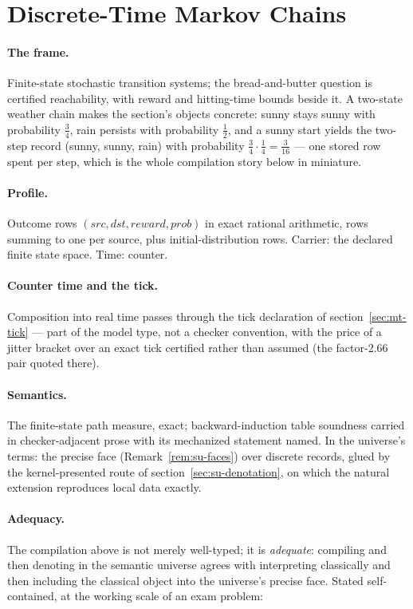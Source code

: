 \section{Discrete-Time Markov Chains}
\label{sec:mt-dtmc}

\paragraph{The frame.} Finite-state stochastic transition systems;
the bread-and-butter question is certified reachability, with reward
and hitting-time bounds beside it. A two-state weather chain makes
the section's objects concrete: sunny stays sunny with probability
$\tfrac{3}{4}$, rain persists with probability $\tfrac{1}{2}$, and a
sunny start yields the two-step record (sunny, sunny, rain) with
probability $\tfrac{3}{4} \cdot \tfrac{1}{4} = \tfrac{3}{16}$ ---
one stored row spent per step, which is the whole compilation story
below in miniature.

\paragraph{Profile.} Outcome rows $(\mathit{src}, \mathit{dst},
\mathit{reward}, \mathit{prob})$ in exact rational arithmetic, rows
summing to one per source, plus initial-distribution rows. Carrier:
the declared finite state space. Time: counter.

\paragraph{Counter time and the tick.} Composition into real time
passes through the tick declaration of section~\ref{sec:mt-tick}
--- part of
the model type, not a checker convention, with the price of a jitter
bracket over an exact tick certified rather than assumed (the
factor-$2.66$ pair quoted there).

\paragraph{Semantics.} The finite-state path measure, exact;
backward-induction table soundness carried in checker-adjacent prose
with its mechanized statement named. In the universe's terms: the
precise face (Remark~\ref{rem:su-faces}) over discrete records,
glued by the kernel-presented route of
section~\ref{sec:su-denotation}, on which the natural extension
reproduces local data exactly.

\paragraph{Adequacy.} The compilation above is not merely
well-typed; it is \emph{adequate}: compiling and then denoting in
the semantic universe agrees with interpreting classically and then
including the classical object into the universe's precise face.
Stated self-contained, at the working scale of an exam problem:

